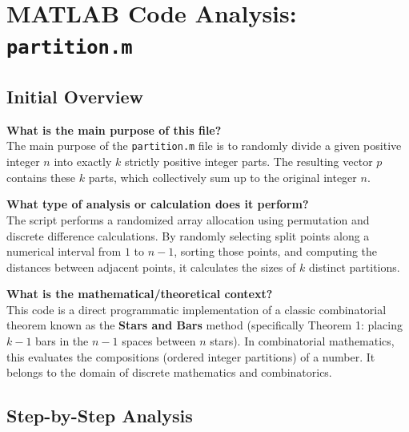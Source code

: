 
\chapter{MATLAB Code Analysis: \texttt{partition.m}}
\date{}


\maketitle

\section{Initial Overview}

\textbf{What is the main purpose of this file?}\\
The main purpose of the \texttt{partition.m} file is to randomly divide a given positive integer $n$ into exactly $k$ strictly positive integer parts. The resulting vector $p$ contains these $k$ parts, which collectively sum up to the original integer $n$.

\textbf{What type of analysis or calculation does it perform?}\\
The script performs a randomized array allocation using permutation and discrete difference calculations. By randomly selecting split points along a numerical interval from $1$ to $n-1$, sorting those points, and computing the distances between adjacent points, it calculates the sizes of $k$ distinct partitions.

\textbf{What is the mathematical/theoretical context?}\\
This code is a direct programmatic implementation of a classic combinatorial theorem known as the \textbf{Stars and Bars} method (specifically Theorem 1: placing $k-1$ bars in the $n-1$ spaces between $n$ stars). In combinatorial mathematics, this evaluates the compositions (ordered integer partitions) of a number. It belongs to the domain of discrete mathematics and combinatorics.

\section{Step-by-Step Analysis}

